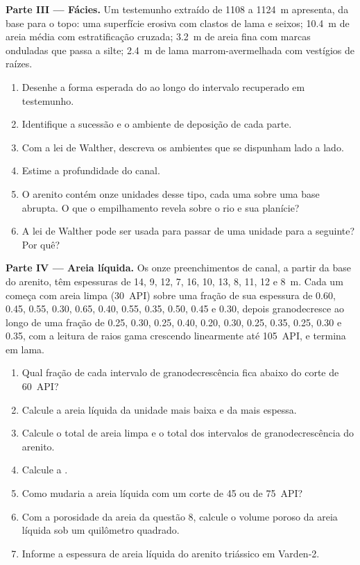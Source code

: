 \begin{problem}
\medskip\noindent\textbf{Parte III --- Fácies.} Um testemunho extraído de 1108 a
\qty{1124}{m} apresenta, da base para o topo: uma superfície erosiva com clastos de lama e
seixos; \qty{10.4}{m} de areia média com estratificação cruzada; \qty{3.2}{m} de areia fina com marcas onduladas
que passa a silte; \qty{2.4}{m} de lama marrom-avermelhada com vestígios de raízes.
\begin{enumerate}[resume]
\item Desenhe a forma esperada do  ao longo do intervalo recuperado em testemunho.
\item Identifique a sucessão e o ambiente de deposição de cada parte.
\item Com a lei de Walther, descreva os ambientes que se dispunham lado a lado.
\item Estime a profundidade do canal.
\item O arenito contém onze unidades desse tipo, cada uma sobre uma base abrupta. O que
  o empilhamento revela sobre o rio e sua planície?
\item A lei de Walther pode ser usada para passar de uma unidade para a seguinte? Por quê?
\end{enumerate}

\medskip\noindent\textbf{Parte IV --- Areia líquida.} Os onze preenchimentos de canal,
a partir da base do arenito, têm espessuras de 14, 9, 12, 7, 16, 10, 13, 8, 11, 12 e
\qty{8}{m}. Cada um começa com areia limpa (\qty{30}{API}) sobre uma fração
de sua espessura de 0.60, 0.45, 0.55, 0.30, 0.65, 0.40, 0.55, 0.35, 0.50,
0.45 e 0.30, depois granodecresce ao longo de uma fração de 0.25, 0.30, 0.25, 0.40,
0.20, 0.30, 0.25, 0.35, 0.25, 0.30 e 0.35, com a leitura de raios gama crescendo linearmente até
\qty{105}{API}, e termina em lama.
\begin{enumerate}[resume]
\item Qual fração de cada intervalo de granodecrescência fica abaixo do
  corte de \qty{60}{API}?
\item Calcule a areia líquida da unidade mais baixa e da mais espessa.
\item Calcule o total de areia limpa e o total dos intervalos de
  granodecrescência do arenito.
\item Calcule a .
\item Como mudaria a areia líquida com um corte de 45 ou de
  \qty{75}{API}?
\item Com a porosidade da areia da questão 8, calcule o volume poroso da
  areia líquida sob um quilômetro quadrado.
\item Informe a espessura de areia líquida do arenito triássico em Varden-2.
\end{enumerate}
\end{problem}
